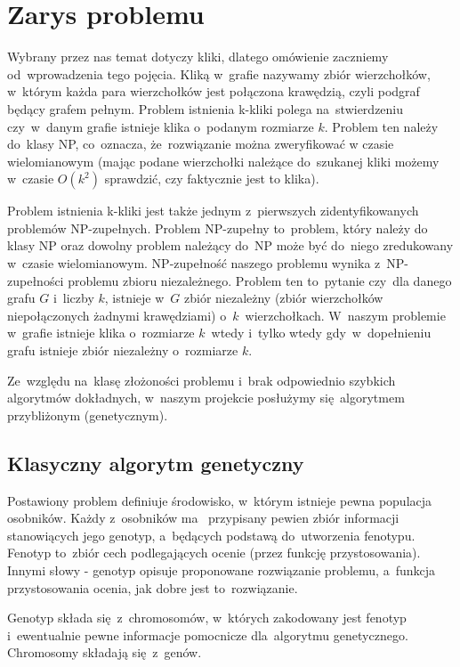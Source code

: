 \documentclass[11pt]{aghdpl}
\author{Wojciech Kasperek, Krzysztof Spytkowski, Izabela Śmietana}
\date{2014}
\begin{document}
\titlepages
\vspace*{-20mm}
\tableofcontents
\clearpage

\chapter{Zarys problemu}
\label{cha:zarys}

Wybrany przez nas temat dotyczy kliki, dlatego omówienie zaczniemy od~wprowadzenia tego pojęcia. 
Kliką w~grafie nazywamy zbiór wierzchołków, w~którym każda para wierzchołków jest połączona krawędzią, 
czyli podgraf będący grafem pełnym. Problem istnienia k-kliki polega na~stwierdzeniu 
czy~w~danym grafie istnieje klika o~podanym rozmiarze $k$. Problem ten należy do~klasy NP, co~oznacza, że~rozwiązanie 
można zweryfikować w czasie wielomianowym (mając podane wierzchołki należące do~szukanej
kliki możemy w~czasie $O(k^2)$ sprawdzić, czy faktycznie jest to klika).

Problem istnienia k-kliki jest także jednym z~pierwszych zidentyfikowanych problemów NP-zupełnych. 
Problem NP-zupełny to~problem, który należy do klasy NP oraz dowolny problem należący do~NP może być do~niego 
zredukowany w~czasie wielomianowym. NP-zupełność naszego problemu wynika z~NP-zupełności problemu 
zbioru niezależnego. Problem ten to~pytanie czy~dla danego grafu $G$ i~liczby $k$, istnieje w~$G$ zbiór 
niezależny (zbiór wierzchołków niepołączonych żadnymi krawędziami) o~$k$~wierzchołkach. W~naszym problemie 
w~grafie istnieje klika o~rozmiarze $k$~wtedy i~tylko wtedy gdy~w~dopełnieniu grafu istnieje zbiór niezależny 
o~rozmiarze $k$.

Ze~względu na~klasę złożoności problemu i~brak odpowiednio szybkich algorytmów dokładnych, w~naszym projekcie 
posłużymy się~algorytmem przybliżonym (genetycznym). 

\section{Klasyczny algorytm genetyczny}
\label{sec:algGenetyczne}
Postawiony problem definiuje środowisko, w~którym istnieje pewna populacja osobników. Każdy z~osobników ma~
przypisany pewien zbiór informacji stanowiących jego genotyp, a~będących podstawą do~utworzenia
fenotypu. Fenotyp to~zbiór cech podlegających ocenie (przez funkcję przystosowania).
Innymi słowy - genotyp opisuje proponowane rozwiązanie problemu, a~funkcja przystosowania ocenia, jak
dobre jest to~rozwiązanie.

Genotyp składa się~z~chromosomów, w~których zakodowany jest fenotyp i~ewentualnie pewne informacje
pomocnicze dla~algorytmu genetycznego. Chromosomy składają się~z~genów.
\end{document}
